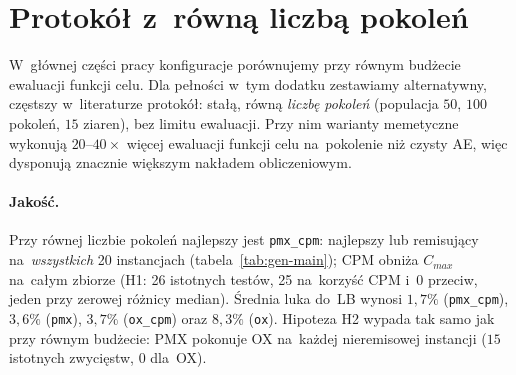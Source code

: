 \documentclass[pdflatex,sn-mathphys,Numbered]{sn-jnl}
\begin{document}
\appendix
\section{Protokół z~równą liczbą pokoleń}
\label{app:gen}
W~głównej części pracy konfiguracje porównujemy przy równym budżecie ewaluacji
funkcji celu. Dla pełności w~tym dodatku zestawiamy alternatywny, częstszy
w~literaturze protokół: stałą, równą \emph{liczbę pokoleń} (populacja $50$, $100$
pokoleń, $15$ ziaren), bez limitu ewaluacji. Przy nim warianty memetyczne wykonują
$20$--$40\times$ więcej ewaluacji funkcji celu na~pokolenie niż czysty AE, więc
dysponują znacznie większym nakładem obliczeniowym.

\paragraph{Jakość.} Przy równej liczbie pokoleń najlepszy jest \texttt{pmx\_cpm}:
najlepszy lub remisujący na~\emph{wszystkich} 20 instancjach
(tabela~\ref{tab:gen-main}); CPM obniża $C_{max}$ na~całym zbiorze (H1: 26 istotnych
testów, 25 na~korzyść CPM i~$0$ przeciw, jeden przy zerowej różnicy median). Średnia luka do~LB wynosi $1{,}7\%$
(\texttt{pmx\_cpm}), $3{,}6\%$ (\texttt{pmx}), $3{,}7\%$ (\texttt{ox\_cpm}) oraz
$8{,}3\%$ (\texttt{ox}). Hipoteza H2 wypada tak samo jak przy równym budżecie: PMX
pokonuje OX na~każdej nieremisowej instancji ($15$ istotnych zwycięstw, $0$ dla~OX).
\end{document}
